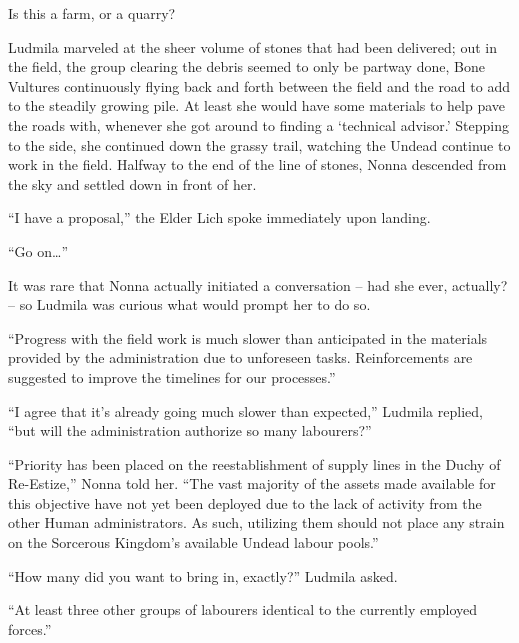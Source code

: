  

Is this a farm, or a quarry?

 

Ludmila marveled at the sheer volume of stones that had been delivered; out in the field, the group clearing the debris seemed to only be partway done, Bone Vultures continuously flying back and forth between the field and the road to add to the steadily growing pile. At least she would have some materials to help pave the roads with, whenever she got around to finding a ‘technical advisor.’ Stepping to the side, she continued down the grassy trail, watching the Undead continue to work in the field. Halfway to the end of the line of stones, Nonna descended from the sky and settled down in front of her.

 

“I have a proposal,” the Elder Lich spoke immediately upon landing.

 

“Go on…”

 

It was rare that Nonna actually initiated a conversation – had she ever, actually? – so Ludmila was curious what would prompt her to do so.

 

“Progress with the field work is much slower than anticipated in the materials provided by the administration due to unforeseen tasks. Reinforcements are suggested to improve the timelines for our processes.”

 

“I agree that it’s already going much slower than expected,” Ludmila replied, “but will the administration authorize so many labourers?”

 

“Priority has been placed on the reestablishment of supply lines in the Duchy of Re-Estize,” Nonna told her. “The vast majority of the assets made available for this objective have not yet been deployed due to the lack of activity from the other Human administrators. As such, utilizing them should not place any strain on the Sorcerous Kingdom’s available Undead labour pools.”

 

“How many did you want to bring in, exactly?” Ludmila asked.

 

“At least three other groups of labourers identical to the currently employed forces.”

 

